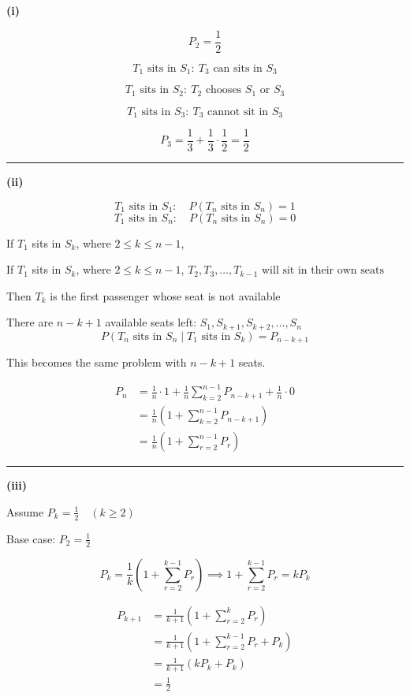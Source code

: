 \documentclass[12pt]{article}
\begin{document}
\newcommand{\ds}{\displaystyle}

\textbf{(i)}

$$P_2=\frac12$$

$$T_1\text{ sits in }S_1:\ T_3\text{ can sits in }S_3$$

$$T_1\text{ sits in }S_2:\ T_2\text{ chooses }S_1\text{ or }S_3$$

$$T_1\text{ sits in }S_3:\ T_3\text{ cannot sit in }S_3$$

$$P_3=\frac13+\frac13\cdot\frac12=\frac12$$

\bigskip\hrule\bigskip

\textbf{(ii)}

$$T_1\text{ sits in }S_1:\quad P(T_n\text{ sits in }S_n)=1$$
$$T_1\text{ sits in }S_n:\quad P(T_n\text{ sits in }S_n)=0$$

If $T_1$ sits in $S_k$, where $\ds 2\leq k\leq n-1$,


If $T_1$ sits in $S_k$, where $\ds 2\leq k\leq n-1$, $T_2,T_3,\ldots,T_{k-1}\text{ will sit in their own seats}$

Then $T_k$ is the first passenger whose seat is not available

There are $n-k+1$ available seats left: $\ds S_1,S_{k+1},S_{k+2},\ldots,S_n$
$$P(T_n\text{ sits in }S_n\mid T_1\text{ sits in }S_k)=P_{n-k+1}$$


This becomes the same problem with $n-k+1$ seats.

\begin{align*}
P_n
&=\frac1n\cdot 1+\frac1n\sum_{k=2}^{n-1}P_{n-k+1}+\frac1n\cdot 0\\
&=\frac1n\left(1+\sum_{k=2}^{n-1}P_{n-k+1}\right)\\
&=\frac1n\left(1+\sum_{r=2}^{n-1}P_r\right)
\end{align*}



\bigskip\hrule\bigskip

\textbf{(iii)}

Assume $\ds P_k=\frac12\quad (k\geq2)$

Base case: $\ds P_2=\frac12$


$$P_k=\frac1k\left(1+\sum_{r=2}^{k-1}P_r\right)\implies 1+\sum_{r=2}^{k-1}P_r=kP_k$$

\begin{align*}
P_{k+1}
&=\frac1{k+1}\left(1+\sum_{r=2}^{k}P_r\right)\\
&=\frac1{k+1}\left(1+\sum_{r=2}^{k-1}P_r+P_k\right)\\
&=\frac1{k+1}(kP_k+P_k)\\
&=\frac12
\end{align*}
\end{document}
